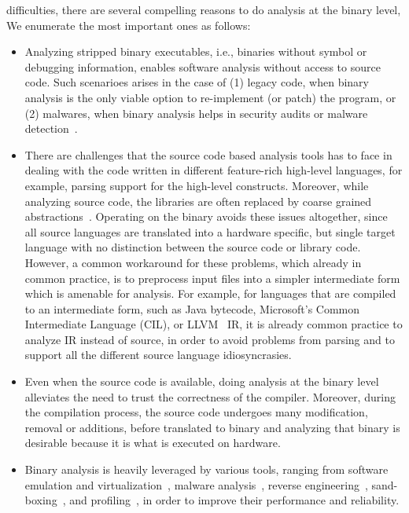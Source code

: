          difficulties, there are several compelling reasons to do analysis at
         the binary level, We enumerate the most important ones as follows:
\begin{itemize}

    \item Analyzing stripped binary executables, i.e., binaries without symbol
    or debugging information, enables software analysis without access to
    source code. Such scenarioes arises in the case of (1) legacy code, when
    binary analysis is the only viable option to re-implement (or patch) the
    program, or (2) malwares, when binary analysis helps in security audits or
    malware
    detection~\cite{Christodorescu:2005,Andreas2007,Kinder:2005,Kinder:2010,Kolbitsch:2009}.
    
    \item There are challenges that the source code based analysis tools has to
    face  in dealing with the code written in different feature-rich high-level
    languages, for example, parsing support for  the high-level constructs.
    Moreover, while analyzing source code, the libraries are often replaced by
    coarse grained abstractions~\cite{libabs}. Operating on the binary avoids
    these issues altogether, since all source languages are translated into a
    hardware specific, but single target language with no distinction between
    the source code or library code. However, a common workaround for these
    problems, which already in common practice, is to preprocess input files
    into a simpler intermediate form which is amenable for analysis. For
    example, for languages that are compiled to an intermediate form, such as
    Java bytecode, Microsoft's Common Intermediate Language (CIL), or
    LLVM~\cite{Lattner:2004} IR, it is already common practice to analyze IR
    instead of source, in order to avoid problems from parsing and to support
    all the different source language idiosyncrasies.
    
    \item Even when the source code is available, doing analysis at the binary
    level alleviates the need to trust the correctness of the compiler.
    Moreover, during the compilation process, the source code undergoes many
    modification, removal or additions, before translated to binary and
    analyzing that binary is desirable because it is what is executed on
    hardware. 
    
    \item Binary analysis is heavily leveraged by various tools, ranging from
    software emulation and
    virtualization~\cite{QEMU:USENIX05,Valgrind:ENTCS03,DynamoRIO:2004,Pin:2005},
    malware analysis~\cite{BitBlaze:2008,BAP:CAV11,Egele:USENIX07,Yin:CCS07},
    reverse engineering~\cite{McSema:Recon14,Angr,Radare2},
    sand-boxing~\cite{Kiriansky:2002:SEV,Erlingsson:2006,Yee:2009}, and
    profiling~\cite{Harris:2005,Srivastava:1994}, in order to improve their
    performance and reliability.
\end{itemize}

